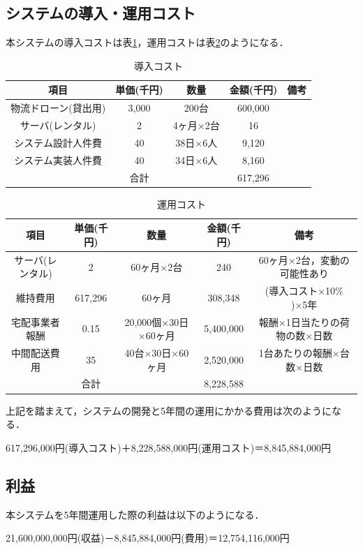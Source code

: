 \documentclass[a4paper, titlepage]{jsarticle}
\begin{document}
\subsection{システムの導入・運用コスト}
本システムの導入コストは表\ref{tab:label1}，運用コストは表\ref{tab:label2}のようになる．
\begin{table}[H]
  \centering
  \caption{導入コスト}
  \begin{tabular}{c c c c c}
    \hline
    項目 & 単価(千円) & 数量 & 金額(千円) & 備考 \\
    \hline \hline
    物流ドローン(貸出用) & 3,000 & 200台 & 600,000 & \\
    サーバ(レンタル) & 2 & 4ヶ月×2台 & 16 & \\
    システム設計人件費 & 40 & 38日×6人 & 9,120 & \\
    システム実装人件費 & 40 & 34日×6人 & 8,160 & \\
    \hline \hline
    & 合計 & & 617,296 & \\
    \hline
  \end{tabular}
  \label{tab:label1}
\end{table}

\begin{table}[H]
  \centering
  \caption{運用コスト}
  \begin{tabular}{c c c c c}
    \hline
    項目 & 単価(千円) & 数量 & 金額(千円) & 備考 \\
    \hline \hline
    サーバ(レンタル) & 2 & 60ヶ月×2台 & 240 & 60ヶ月×2台，変動の可能性あり \\
    維持費用 & 617,296 & 60ヶ月 & 308,348 & (導入コスト×10\% )×5年 \\
    宅配事業者報酬 & 0.15 & 20,000個×30日×60ヶ月 & 5,400,000 & 報酬×1日当たりの荷物の数×日数 \\
    中間配送費用 & 35 & 40台×30日×60ヶ月 & 2,520,000 & 1台あたりの報酬×台数×日数 \\
    \hline \hline
    & 合計 & & 8,228,588 & \\
    \hline
  \end{tabular}
  \label{tab:label2}
\end{table}

上記を踏まえて，システムの開発と5年間の運用にかかる費用は次のようになる．
\begin{center}
  617,296,000円(導入コスト)＋8,228,588,000円(運用コスト)＝8,845,884,000円
\end{center}

\subsection{利益}
本システムを5年間運用した際の利益は以下のようになる．
\begin{center}
  21,600,000,000円(収益)－8,845,884,000円(費用)＝12,754,116,000円
\end{center}
\end{document}
